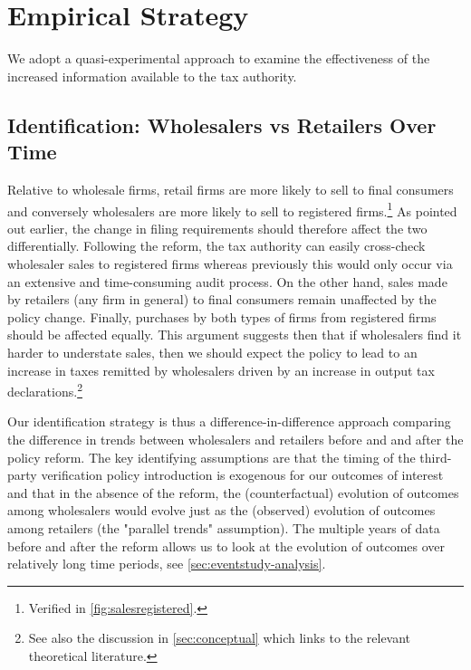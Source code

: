 
\section{Empirical Strategy}
\label{sec:empirical_strategy}
We adopt a quasi-experimental approach to examine the effectiveness of the increased information available to the tax authority.

\subsection{Identification: Wholesalers vs Retailers Over Time}
\label{subsec:identification}
Relative to wholesale firms, retail firms are more likely to sell to final consumers and conversely wholesalers are more likely to sell to registered firms.\footnote{Verified in \cref{fig:salesregistered}.} As pointed out earlier, the change in filing requirements should therefore affect the two differentially. Following the reform, the tax authority can easily cross-check wholesaler sales to registered firms whereas previously this would only occur via an extensive and time-consuming audit process. On the other hand, sales made by retailers (any firm in general) to final consumers remain unaffected by the policy change. Finally, purchases by both types of firms from registered firms should be affected equally. This argument suggests then that if wholesalers find it harder to understate sales, then we should expect the policy to lead to an increase in taxes remitted by wholesalers driven by an increase in output tax declarations.\footnote{See also the discussion in \cref{sec:conceptual} which links to the relevant theoretical literature.}

Our identification strategy is thus a difference-in-difference approach comparing the difference in trends between wholesalers and retailers before and and after the policy reform. The key identifying assumptions are that the timing of the third-party verification policy introduction is exogenous for our outcomes of interest and that in the absence of the reform, the (counterfactual) evolution of outcomes among wholesalers would evolve just as the (observed) evolution of outcomes among retailers (the "parallel trends" assumption). The multiple years of data before and after the reform allows us to look at the evolution of outcomes over relatively long time periods, see \cref{sec:eventstudy-analysis}.

